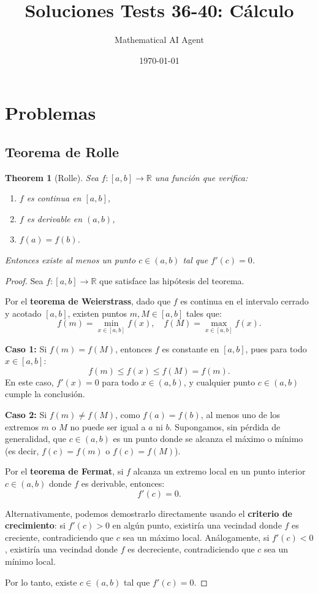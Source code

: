\documentclass[11pt,a4paper]{article}
\title{Soluciones Tests 36-40: Cálculo}
\author{Mathematical AI Agent}
\date{\today}
\theoremstyle{plain}
\newtheorem{theorem}{Theorem}[section]
\theoremstyle{definition}
\begin{document}
\maketitle

\section{Problemas}

\subsection{Teorema de Rolle}

\begin{theorem}[Rolle]
Sea $f: [a,b] \to \mathbb{R}$ una función que verifica:
\begin{enumerate}
    \item $f$ es continua en $[a,b]$,
    \item $f$ es derivable en $(a,b)$,
    \item $f(a) = f(b)$.
\end{enumerate}
Entonces existe al menos un punto $c \in (a,b)$ tal que $f'(c) = 0$.
\end{theorem}

\begin{proof}
Sea $f: [a,b] \to \mathbb{R}$ que satisface las hipótesis del teorema.

Por el \textbf{teorema de Weierstrass}, dado que $f$ es continua en el intervalo cerrado y acotado $[a,b]$, existen puntos $m, M \in [a,b]$ tales que:
\[
f(m) = \min_{x \in [a,b]} f(x), \quad f(M) = \max_{x \in [a,b]} f(x).
\]

\textbf{Caso 1:} Si $f(m) = f(M)$, entonces $f$ es constante en $[a,b]$, pues para todo $x \in [a,b]$:
\[
f(m) \leq f(x) \leq f(M) = f(m).
\]
En este caso, $f'(x) = 0$ para todo $x \in (a,b)$, y cualquier punto $c \in (a,b)$ cumple la conclusión.

\textbf{Caso 2:} Si $f(m) \neq f(M)$, como $f(a) = f(b)$, al menos uno de los extremos $m$ o $M$ no puede ser igual a $a$ ni $b$. Supongamos, sin pérdida de generalidad, que $c \in (a,b)$ es un punto donde se alcanza el máximo o mínimo (es decir, $f(c) = f(m)$ o $f(c) = f(M)$).

Por el \textbf{teorema de Fermat}, si $f$ alcanza un extremo local en un punto interior $c \in (a,b)$ donde $f$ es derivable, entonces:
\[
f'(c) = 0.
\]

Alternativamente, podemos demostrarlo directamente usando el \textbf{criterio de crecimiento}: si $f'(c) > 0$ en algún punto, existiría una vecindad donde $f$ es creciente, contradiciendo que $c$ sea un máximo local. Análogamente, si $f'(c) < 0$, existiría una vecindad donde $f$ es decreciente, contradiciendo que $c$ sea un mínimo local.

Por lo tanto, existe $c \in (a,b)$ tal que $f'(c) = 0$.
\end{proof}
\end{document}
